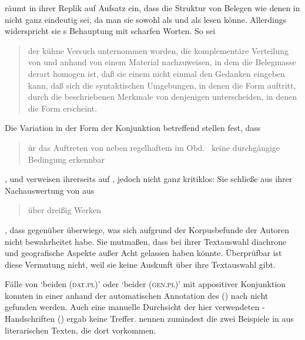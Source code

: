 \citet[187]{gjelsten1980} räumt in ihrer Replik auf 
Aufsatz ein, dass die Struktur von Belegen wie denen in 
nicht ganz eindeutig sei, da man sie sowohl als  und als  lesen
könne. Allerdings widerspricht sie \citeauthor{askedal1974}s Behauptung mit
scharfen Worten. So sei \blockcquote[196]{gjelsten1980}{der kühne Versuch
unternommen worden, die komplementäre Verteilung
von  und  anhand von einem Material nachzuweisen, in dem
die Belegmasse derart homogen ist, daß sie einem nicht
einmal den Gedanken eingeben kann, daß sich die syntaktischen Umgebungen, in
denen die Form  auftritt, durch die beschriebenen Merkmale von
denjenigen unterscheiden, in denen die Form  erscheint.}

Die Variation in der Form der Konjunktion betreffend stellen
\citet[628]{ksw2} fest, dass \blockquote{ür das Auftreten von
 neben regelhaftem  im Obd.\ \textelp{} keine
durchgängige Bedingung erkennbar }, und
verweisen ihrerseits auf \citet{gjelsten1980}, jedoch nicht ganz kritiklos: Sie
schließe aus ihrer Nachauswertung von  aus
\blockcquote[198]{gjelsten1980}{über dreißig Werken}, dass 
gegenüber  überwiege, was sich aufgrund der
Korpusbefunde der Autoren nicht bewahrheitet habe.
Sie mutmaßen, dass \citeauthor{gjelsten1980} bei ihrer Textauswahl
diachrone und geografische Aspekte außer
Acht gelassen haben könnte. Überprüfbar ist diese Vermutung nicht, weil sie
keine Auskunft über ihre Textauswahl gibt.

Fälle von  `beiden (\textsc{dat.pl})' oder  `beider
(\textsc{gen.pl})' mit appositiver Konjunktion konnten in
einer  anhand der automatischen Annotation des
 (\CAO) nach \citet{schmid2019}
nicht gefunden werden. Auch eine manuelle Durchsicht der hier verwendeten
-Handschriften (\KC) ergab keine Treffer. \citet[626]{ksw2}
nennen zumindest die zwei Beispiele in  aus literarischen
Texten, die dort  vorkommen.

